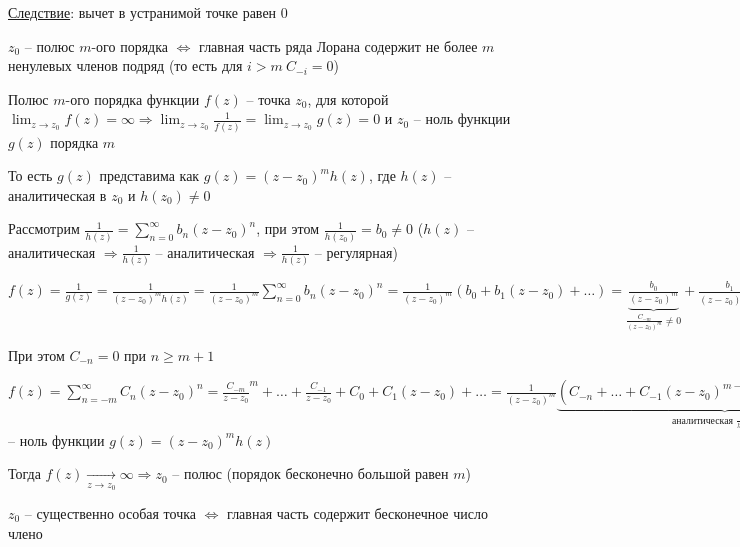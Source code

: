 \documentclass[12pt]{article}
\begin{document}
\underline{Следствие}: вычет в устранимой точке равен 0

\begin{MyTheorem}
     $z_0$ -- полюс $m$-ого порядка $\Longleftrightarrow$ главная часть ряда Лорана содержит не более $m$ ненулевых членов подряд (то есть для $i > m \ C_{-i} = 0$) 
\end{MyTheorem}

\begin{MyProof}
    Полюс $m$-ого порядка функции $f(z)$ -- точка $z_0$, для которой $\lim_{z \to z_0} f(z) = \infty \Longrightarrow \lim_{z \to z_0} \frac{1}{f(z)} = \lim_{z \to z_0} g(z) = 0$ и $z_0$ -- ноль функции $g(z)$ порядка $m$
    
    То есть $g(z)$ представима как $g(z) = (z - z_0)^m h(z)$, где $h(z)$ -- аналитическая в $z_0$ и $h(z_0) \neq 0$

    \fbox{$\Longrightarrow$} Рассмотрим $\frac{1}{h(z)} = \sum_{n = 0}^\infty b_n (z - z_0)^n$, при этом $\frac{1}{h(z_0)} = b_0 \neq 0$ ($h(z)$ -- аналитическая $\Longrightarrow \frac{1}{h(z)}$ -- аналитическая $\Longrightarrow \frac{1}{h(z)}$ -- регулярная)

    $f(z) = \frac{1}{g(z)} = \frac{1}{(z - z_0)^m h(z)} = \frac{1}{(z - z_0)^m} \sum_{n = 0}^\infty b_n (z - z_0)^n = \frac{1}{(z - z_0)^m} (b_0 + b_1 (z - z_0) + \dots) = \underset{\frac{C_{-m}}{(z - z_0)^m} \neq 0}{\underbrace{\frac{b_0}{(z - z_0)^m}}} + \frac{b_1}{(z - z_0)^{m - 1}} + \dots + \frac{b_n}{(z - z_0)^{m - n}} + \dots = \sum_{n = -m}^\infty C_n (z - z_0)^n$

    При этом $C_{-n} = 0$ при $n \geq m + 1$

    \mediumvspace

    \fbox{$\Longleftarrow$} $f(z) = \sum_{n = -m}^\infty C_n (z - z_0)^n = \frac{C_{-m}}{z - z_0}^m + \dots + \frac{C_{-1}}{z - z_0} + C_0 + C_1 (z - z_0) + \dots = \frac{1}{(z - z_0)^m} \underset{\text{аналитическая } \frac{1}{h(z)} \text{ в } z_0}{\underbrace{(C_{-n} + \dots + C_{-1} (z - z_0)^{m - 1} + C_0 (z - z_0)^m + \dots)}} = \frac{1}{(z - z_0)^m h(z)} \Longrightarrow z_0$ -- ноль функции $g(z) = (z - z_0)^m h(z)$

    Тогда $f(z) \underset{z \to z_0}{\longrightarrow} \infty \Longrightarrow z_0$ -- полюс (порядок бесконечно большой равен $m$)
\end{MyProof}

\begin{MyTheorem}
     $z_0$ -- существенно особая точка $\Longleftrightarrow$ главная часть содержит бесконечное число члено
\end{MyTheorem}
\end{document}
